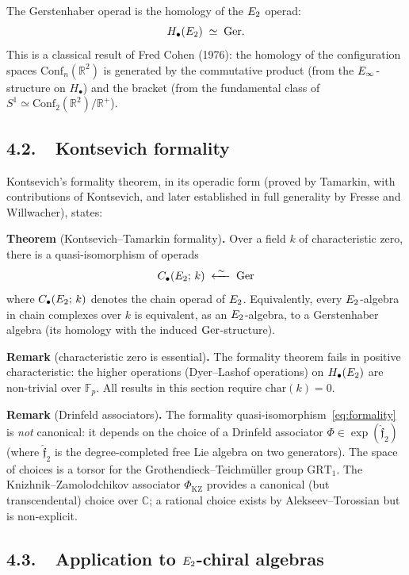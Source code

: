 The Gerstenhaber operad is the homology of the $E_2$ operad:
\[
 H_\bullet(E_2) \;\simeq\; \mathrm{Ger}.
\]
This is a classical result of Fred Cohen (1976): the homology of
the configuration spaces $\mathrm{Conf}_n(\mathbb{R}^2)$ is generated
by the commutative product (from the $E_\infty$-structure on
$H_\bullet$) and the bracket (from the fundamental class of
$S^1 \simeq \mathrm{Conf}_2(\mathbb{R}^2)/\mathbb{R}^+$).

\subsection*{4.2.\ \ Kontsevich formality}

Kontsevich's formality theorem, in its operadic form (proved by
Tamarkin, with contributions of Kontsevich, and later established
in full generality by Fresse and Willwacher), states:

\medskip
\noindent\textbf{Theorem} (Kontsevich--Tamarkin formality)\textbf{.}\;
Over a field $k$ of characteristic zero, there is a quasi-isomorphism
of operads
\begin{equation}\label{eq:formality}
 C_\bullet(E_2;\, k)
 \;\xleftarrow{\;\sim\;}\;
 \mathrm{Ger}
\end{equation}
where $C_\bullet(E_2;\, k)$ denotes the chain operad of $E_2$.
Equivalently, every $E_2$-algebra in chain complexes over $k$ is
equivalent, as an $E_2$-algebra, to a Gerstenhaber algebra (its
homology with the induced $\mathrm{Ger}$-structure).

\medskip
\noindent\textbf{Remark} (characteristic zero is essential)\textbf{.}
The formality theorem fails in positive characteristic: the higher
operations (Dyer--Lashof operations) on $H_\bullet(E_2)$ are
non-trivial over $\mathbb{F}_p$. All results in this section
require $\mathrm{char}(k) = 0$.

\medskip
\noindent\textbf{Remark} (Drinfeld associators)\textbf{.}
The formality quasi-isomorphism~\eqref{eq:formality} is \emph{not}
canonical: it depends on the choice of a Drinfeld associator
$\Phi \in \exp(\hat{\mathfrak{f}}_2)$ (where $\hat{\mathfrak{f}}_2$
is the degree-completed free Lie algebra on two generators).
The space of choices is a torsor for the Grothendieck--Teichm\"uller
group $\mathrm{GRT}_1$. The Knizhnik--Zamolodchikov associator
$\Phi_{\mathrm{KZ}}$ provides a canonical (but transcendental) choice
over $\mathbb{C}$; a rational choice exists by Alekseev--Torossian
but is non-explicit.

\subsection*{4.3.\ \ Application to $E_2$-chiral algebras}


